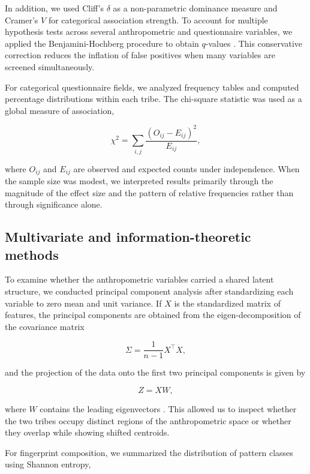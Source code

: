 \documentclass[11pt]{article}
\begin{document}
In addition, we used Cliff's $\delta$ as a non-parametric dominance measure and Cramer's $V$ for categorical association strength. To account for multiple hypothesis tests across several anthropometric and questionnaire variables, we applied the Benjamini-Hochberg procedure to obtain $q$-values \cite{benjamini1995}. This conservative correction reduces the inflation of false positives when many variables are screened simultaneously.

For categorical questionnaire fields, we analyzed frequency tables and computed percentage distributions within each tribe. The chi-square statistic was used as a global measure of association,

\begin{equation}
\chi^2 = \sum_{i,j} \frac{(O_{ij}-E_{ij})^2}{E_{ij}},
\end{equation}

where $O_{ij}$ and $E_{ij}$ are observed and expected counts under independence. When the sample size was modest, we interpreted results primarily through the magnitude of the effect size and the pattern of relative frequencies rather than through significance alone.

\subsection{Multivariate and information-theoretic methods}
To examine whether the anthropometric variables carried a shared latent structure, we conducted principal component analysis after standardizing each variable to zero mean and unit variance. If $X$ is the standardized matrix of features, the principal components are obtained from the eigen-decomposition of the covariance matrix

\begin{equation}
\Sigma = \frac{1}{n-1}X^{\top}X,
\end{equation}

and the projection of the data onto the first two principal components is given by

\begin{equation}
Z = XW,
\end{equation}

where $W$ contains the leading eigenvectors \cite{pearson1901,hotelling1933,jolliffe2002}. This allowed us to inspect whether the two tribes occupy distinct regions of the anthropometric space or whether they overlap while showing shifted centroids.

For fingerprint composition, we summarized the distribution of pattern classes using Shannon entropy,
\end{document}
